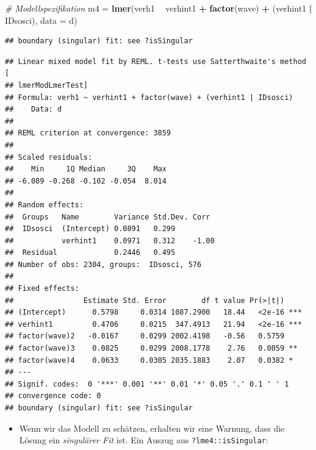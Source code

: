 \documentclass[
]{book}
\newenvironment{Shaded}{\begin{snugshade}}{\end{snugshade}}
\newcommand{\CommentTok}[1]{\textcolor[rgb]{0.56,0.35,0.01}{\textit{#1}}}
\newcommand{\DataTypeTok}[1]{\textcolor[rgb]{0.13,0.29,0.53}{#1}}
\newcommand{\KeywordTok}[1]{\textcolor[rgb]{0.13,0.29,0.53}{\textbf{#1}}}
\newcommand{\NormalTok}[1]{#1}
\newcommand{\OperatorTok}[1]{\textcolor[rgb]{0.81,0.36,0.00}{\textbf{#1}}}
\newcommand{\OtherTok}[1]{\textcolor[rgb]{0.56,0.35,0.01}{#1}}
\newcommand{\StringTok}[1]{\textcolor[rgb]{0.31,0.60,0.02}{#1}}
\providecommand{\tightlist}{%
  \setlength{\itemsep}{0pt}\setlength{\parskip}{0pt}}
\begin{document}
\begin{Shaded}
\begin{Highlighting}[]
\CommentTok{# Modellspezifikation}
\NormalTok{m4 =}\StringTok{ }\KeywordTok{lmer}\NormalTok{(verh1 }\OperatorTok{~}\StringTok{ }\NormalTok{verhint1 }\OperatorTok{+}\StringTok{ }\KeywordTok{factor}\NormalTok{(wave) }\OperatorTok{+}\StringTok{ }\NormalTok{(verhint1 }\OperatorTok{|}\StringTok{ }\NormalTok{IDsosci), }\DataTypeTok{data =}\NormalTok{ d)}
\end{Highlighting}
\end{Shaded}

\begin{verbatim}
## boundary (singular) fit: see ?isSingular
\end{verbatim}

\begin{Shaded}
\end{Shaded}

\begin{verbatim}
## Linear mixed model fit by REML. t-tests use Satterthwaite's method [
## lmerModLmerTest]
## Formula: verh1 ~ verhint1 + factor(wave) + (verhint1 | IDsosci)
##    Data: d
## 
## REML criterion at convergence: 3859
## 
## Scaled residuals: 
##    Min     1Q Median     3Q    Max 
## -6.089 -0.268 -0.102 -0.054  8.014 
## 
## Random effects:
##  Groups   Name        Variance Std.Dev. Corr 
##  IDsosci  (Intercept) 0.0891   0.299         
##           verhint1    0.0971   0.312    -1.00
##  Residual             0.2446   0.495         
## Number of obs: 2304, groups:  IDsosci, 576
## 
## Fixed effects:
##                Estimate Std. Error        df t value Pr(>|t|)    
## (Intercept)      0.5798     0.0314 1087.2900   18.44   <2e-16 ***
## verhint1         0.4706     0.0215  347.4913   21.94   <2e-16 ***
## factor(wave)2   -0.0167     0.0299 2002.4198   -0.56   0.5759    
## factor(wave)3    0.0825     0.0299 2008.1778    2.76   0.0059 ** 
## factor(wave)4    0.0633     0.0305 2035.1883    2.07   0.0382 *  
## ---
## Signif. codes:  0 '***' 0.001 '**' 0.01 '*' 0.05 '.' 0.1 ' ' 1
## convergence code: 0
## boundary (singular) fit: see ?isSingular
\end{verbatim}

\begin{itemize}
\tightlist
\item
  Wenn wir das Modell zu schätzen, erhalten wir eine Warnung, dass die Lösung ein \emph{singulärer Fit} ist. Ein Auszug aus \texttt{?lme4::isSingular}:
\end{itemize}
\end{document}
